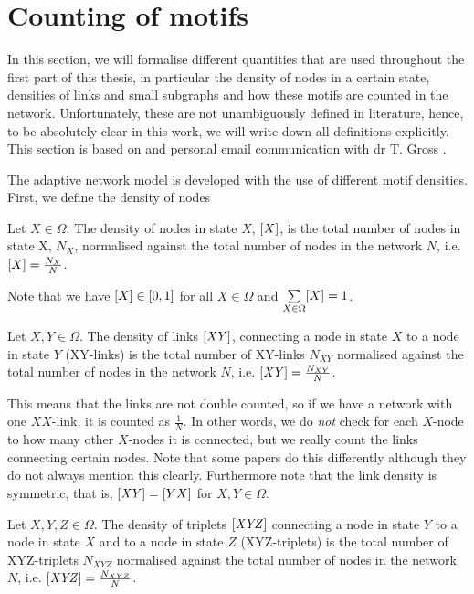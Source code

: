 \section{Counting of motifs}

In this section, we will formalise different quantities that are used throughout the first part of this thesis, in particular the density of nodes in a certain state, densities of links and small subgraphs and how these motifs are counted in the network. Unfortunately, these are not unambiguously defined in literature, hence, to be absolutely clear in this work, we will write down all definitions explicitly. This section is based on \cite{Chen2016, Demirel2014} and personal email communication with dr T. Gross \cite{GrossMail}.

The adaptive network model is developed with the use of different motif densities. First, we define the density of nodes

\begin{definition}
	Let $X\in\Omega$. The density of nodes in state $X$, $[X]$, is the total number of nodes in state X, $N_X$, normalised against the total number of nodes in the network $N$, i.e. $[X]=\frac{N_X}{N}$.
\end{definition}

Note that we have $[X]\in [0,1]$ for all $X \in \Omega$ and $\sum\limits_{X\in\Omega} [X] =1$.

\begin{definition}
	Let $X,Y\in\Omega$. The density of links $\mathit{[XY]}$, connecting a node in state $X$ to a node in state $Y$ (XY-links) is the total number of XY-links $N_{XY}$ normalised against the total number of nodes in the network $N$, i.e. $\mathit{[XY]} = \frac{N_{XY}}{N}$.
\end{definition}

This means that the links are not double counted, so if we have a network with one $XX$-link, it is counted as $\frac{1}{N}$. In other words, we do \textit{not} check for each $X$-node to how many other $X$-nodes it is connected, but we really count the links connecting certain nodes. Note that some papers do this differently although they do not always mention this clearly.  Furthermore note that the link density is symmetric, that is, $\mathit{[XY]} = [YX]$ for $X,Y\in\Omega$. 

\begin{definition}
	Let $X,Y,Z\in\Omega$. The density of triplets $\mathit{[XYZ]}$ connecting a node in state $Y$ to a node in state $X$ and to a node in state $Z$ (XYZ-triplets) is the total number of XYZ-triplets $N_{XYZ}$ normalised against the total number of nodes in the network $N$, i.e. $\mathit{[XYZ]} = \frac{N_{XYZ}}{N}$.
\end{definition}

